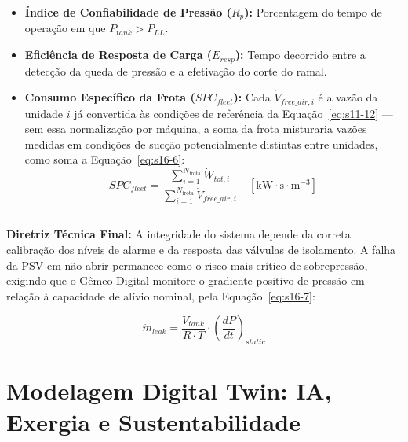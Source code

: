 \documentclass[12pt,a4paper]{article}
\numberwithin{equation}{section}
\numberwithin{table}{section}
\numberwithin{figure}{section}
\begin{document}
{\begin{itemize}
	\item \textbf{Índice de Confiabilidade de Pressão ($R_p$):} Porcentagem do tempo de operação em que $P_{tank} > P_{LL}$.
	\item \textbf{Eficiência de Resposta de Carga ($E_{resp}$):} Tempo decorrido entre a detecção da queda de pressão e a efetivação do corte do ramal.
	\item \textbf{Consumo Específico da Frota ($SPC_{fleet}$):} Cada $\dot{V}_{free\_air,i}$ é a vazão da unidade $i$ já convertida às condições de referência da Equação~\eqref{eq:s11-12} — sem essa normalização por máquina, a soma da frota misturaria vazões medidas em condições de sucção potencialmente distintas entre unidades, como soma a Equação~\eqref{eq:s16-6}:
	\begin{equation}\label{eq:s16-6}
SPC_{fleet} = \frac{\sum_{i=1}^{N_{\text{frota}}} \dot{W}_{tot,i}}{\sum_{i=1}^{N_{\text{frota}}} \dot{V}_{free\_air,i}} \quad [\text{kW} \cdotp \text{s} \cdotp \text{m}^{-3}]
\end{equation}
\end{itemize}

\vspace{1em}
\hrule
\vspace{1em}

\textbf{Diretriz Técnica Final:} A integridade do sistema depende da correta calibração dos níveis de alarme e da resposta das válvulas de isolamento. A falha da PSV em não abrir permanece como o risco mais crítico de sobrepressão, exigindo que o Gêmeo Digital monitore o gradiente positivo de pressão em relação à capacidade de alívio nominal, pela Equação~\eqref{eq:s16-7}:

\begin{equation}\label{eq:s16-7}
\boxed{\dot{m}_{leak} = \frac{V_{tank}}{R \cdotp T} \cdotp \left( \frac{dP}{dt} \right)_{static}}
\end{equation}



\clearpage
\section{Modelagem Digital Twin: IA, Exergia e Sustentabilidade}

}
\end{document}

